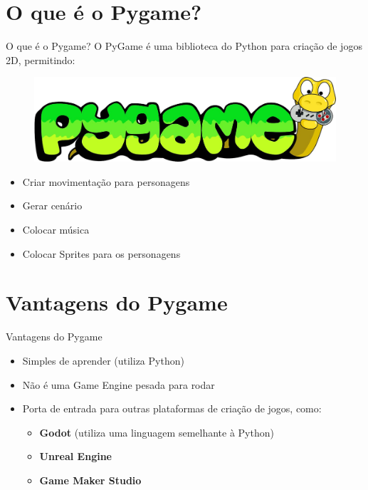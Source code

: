 \documentclass[fleqn,utf8,aspectratio=169,14pt]{beamer}
\begin{document}
	\section{O que é o Pygame?}
	\begin{frame}{O que é o Pygame?}
		O PyGame é uma biblioteca do Python para criação de jogos 2D, permitindo:
		\begin{figure}
			\centering
			\includegraphics[width=0.7\linewidth]{Imagem5}
			\label{fig:imagem5}
		\end{figure}
		
		\begin{itemize}
			\item Criar movimentação para personagens
			\item Gerar cenário
			\item Colocar música
			\item Colocar Sprites para os personagens
		\end{itemize}
		
	\end{frame}
	
	\section{Vantagens do Pygame}
	\begin{frame}{Vantagens do Pygame}
		
		\begin{itemize}
			\item Simples de aprender (utiliza Python)
			\item Não é uma Game Engine pesada para rodar
			\item Porta de entrada para outras plataformas de criação de jogos, como:
			\begin{itemize}
				\item \textbf{Godot} (utiliza uma linguagem semelhante à Python)
				\item \textbf{Unreal Engine}
				\item \textbf{Game Maker Studio}
			\end{itemize}
		\end{itemize}
		
	\end{frame}
	
\end{document}
